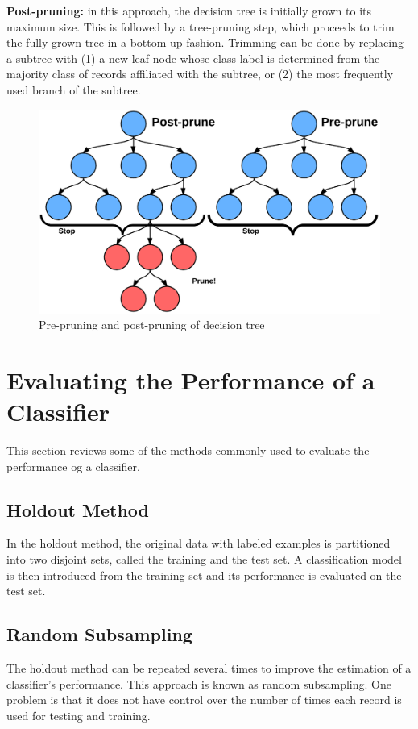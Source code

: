 		{\bf Post-pruning:} in this approach, the decision tree is initially grown 
		to its maximum size. This is followed by a tree-pruning step, which proceeds
		to trim the fully grown tree in a bottom-up fashion. Trimming can be done by
		replacing a subtree with (1) a new leaf node whose class label is determined
		from the majority class of records affiliated with the subtree, or (2) the most
		frequently used branch of the subtree. 

		\begin{figure}[H]
			\centering
			\includegraphics[width=\textwidth]{pics/prepostprune.png}
			\caption{Pre-pruning and post-pruning of decision tree}
		\end{figure}


	\clearpage
	\section{Evaluating the Performance of a Classifier}

		This section reviews some of the methods commonly used to evaluate the 
		performance og a classifier. 

		\subsection*{Holdout Method}
		In the holdout method, the original data with labeled examples is
		partitioned into two disjoint sets, called the training and the test set.
		A classification model is then introduced from the training set and its
		performance is evaluated on the test set. 

		\subsection*{Random Subsampling}
		The holdout method can be repeated several times to improve the estimation
		of a classifier's performance. This approach is known as random subsampling.
		One problem is that it does not have control over the number of times
		each record is used for testing and training. 

